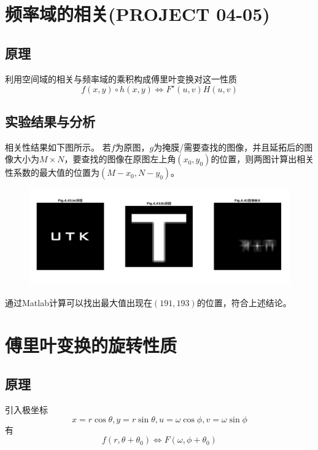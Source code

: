 \documentclass[logo,reportComp]{thesis}
\begin{document}
\section{频率域的相关(PROJECT 04-05)}
\subsection{原理}
利用空间域的相关与频率域的乘积构成傅里叶变换对这一性质
\[f(x,y)\circ h(x,y)\iff F^\star(u,v)H(u,v)\]

\subsection{实验结果与分析}
相关性结果如下图所示。
若$f$为原图，$g$为掩膜/需要查找的图像，并且延拓后的图像大小为$M\times N$，要查找的图像在原图左上角$(x_0,y_0)$的位置，则两图计算出相关性系数的最大值的位置为$(M-x_0,N-y_0)$。
\begin{figure}[H]
\centering
\includegraphics[width=\linewidth]{fig/05.png}
\end{figure}

通过Matlab计算可以找出最大值出现在$(191,193)$的位置，符合上述结论。

\section{傅里叶变换的旋转性质}
\subsection{原理}
引入极坐标
\[x=r\cos\theta,y=r\sin\theta,u=\omega\cos\phi,v=\omega\sin\phi\]
有
\[f(r,\theta+\theta_0)\iff F(\omega,\phi+\theta_0)\]
\end{document}

